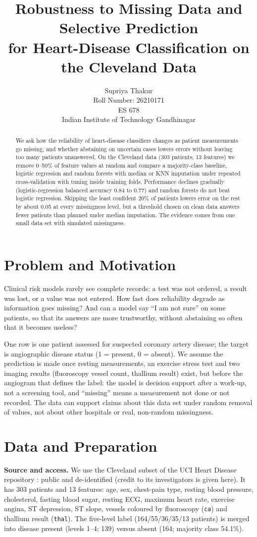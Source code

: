 \documentclass{article}
\title{Robustness to Missing Data and Selective Prediction\\for Heart-Disease Classification on the Cleveland Data}
\author{%
  Supriya Thakur \\
  Roll Number: 26210171 \\
  ES 678 \\
  Indian Institute of Technology Gandhinagar
}
\begin{document}
\maketitle

\begin{abstract}
We ask how the reliability of heart-disease classifiers changes as patient measurements go missing, and whether abstaining on uncertain cases lowers errors without leaving too many patients unanswered.
On the Cleveland data (303 patients, 13 features) we remove 0--50\% of feature values at random and compare a majority-class baseline, logistic regression and random forests with median or KNN imputation under repeated cross-validation with tuning inside training folds.
Performance declines gradually (logistic-regression balanced accuracy 0.84 to 0.77) and random forests do not beat logistic regression.
Skipping the least confident 20\% of patients lowers error on the rest by about 0.05 at every missingness level, but a threshold chosen on clean data answers fewer patients than planned under median imputation.
The evidence comes from one small data set with simulated missingness.
\end{abstract}

\section{Problem and Motivation}
Clinical risk models rarely see complete records: a test was not ordered, a result was lost, or a value was not entered. How fast does reliability degrade as information goes missing? And can a model say ``I am not sure'' on some patients, so that its answers are more trustworthy, without abstaining so often that it becomes useless?

One row is one patient assessed for suspected coronary artery disease; the target is angiographic disease status (1 = present, 0 = absent). We assume the prediction is made once resting measurements, an exercise stress test and two imaging results (fluoroscopy vessel count, thallium result) exist, but before the angiogram that defines the label: the model is decision support after a work-up, not a screening tool, and ``missing'' means a measurement not done or not recorded. The data can support claims about this data set under random removal of values, not about other hospitals or real, non-random missingness.

\section{Data and Preparation}
\textbf{Source and access.} We use the Cleveland subset of the UCI Heart Disease repository \citep{detrano1989,uci}: public and de-identified (credit to its investigators is given here). It has 303 patients and 13 features: age, sex, chest-pain type, resting blood pressure, cholesterol, fasting blood sugar, resting ECG, maximum heart rate, exercise angina, ST depression, ST slope, vessels coloured by fluoroscopy (\texttt{ca}) and thallium result (\texttt{thal}). The five-level label (164/55/36/35/13 patients) is merged into disease present (levels 1--4; 139) versus absent (164; majority class 54.1\%).
\end{document}
